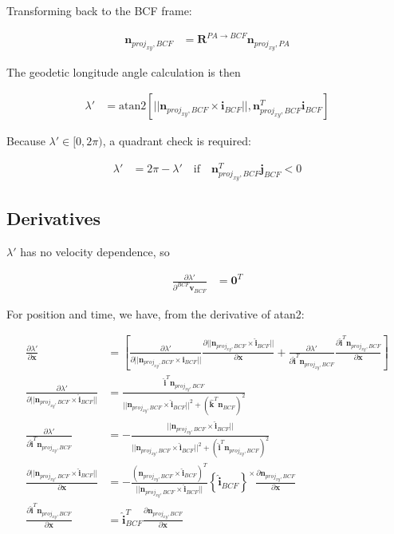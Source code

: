 \documentclass[]{article}
\newcommand{\vb}[1]{\bm{#1}} %
\newcommand{\vbh}[1]{\hat{\bm{#1}}} %
\newcommand{\pd}[2]{\frac{\partial #1}{\partial #2}} %
\newcommand{\crossmat}[1]{\left\{ {#1} \right\}^{\times}} %
\begin{document}
Transforming back to the BCF frame:

\begin{align}
	\vb{n}_{proj_{xy}, BCF} &= \vb{R}^{PA \rightarrow BCF} \vb{n}_{proj_{xy}, PA}
\end{align}

The geodetic longitude angle calculation is then

\begin{align}
	\lambda' &= \mathrm{atan2} \left[ || \vb{n}_{proj_{xy}, BCF} \times \vb{i}_{BCF} ||, \vb{n}_{proj_{xy}, BCF}^T \vb{i}_{BCF} \right]
\end{align}

Because $\lambda' \in [0, 2\pi)$, a quadrant check is required:

\begin{align}
	\lambda' &= 2 \pi - \lambda' \quad \mathrm{if} \quad \vb{n}_{proj_{xy},BCF}^T \vb{j}_{BCF} < 0
\end{align}

\subsection{Derivatives}

$\lambda'$ has no velocity dependence, so

\begin{align}
\pd{\lambda'}{^{BCF} \vb{v}_{BCF}} &= \vb{0}^T
\end{align}

For position and time, we have, from the derivative of atan2:

\begin{align}
\pd{\lambda'}{\vb{x}} &= \left[ \pd{\lambda'}{|| \vb{n}_{proj_{xy},BCF} \times \vbh{i}_{BCF} ||} \pd{|| \vb{n}_{proj_{xy},BCF} \times \vbh{i}_{BCF} ||}{\vb{x}} + \pd{\lambda'}{\vbh{i}^T \vb{n}_{proj_{xy},BCF}} \pd{\vbh{i}^T \vb{n}_{proj_{xy},BCF}}{\vb{x}} \right] \\
\pd{\lambda'}{|| \vb{n}_{proj_{xy},BCF} \times \vbh{i}_{BCF} ||} &= \frac{\vbh{i}^T \vb{n}_{proj_{xy},BCF}}{|| \vb{n}_{proj_{xy},BCF} \times \vbh{i}_{BCF} ||^2 + \left( \vbh{k}^T \vb{n}_{BCF} \right)^2} \\
\pd{\lambda'}{\vbh{i}^T \vb{n}_{proj_{xy},BCF}} &= - \frac{|| \vb{n}_{proj_{xy},BCF} \times \vbh{i}_{BCF} ||}{|| \vb{n}_{proj_{xy},BCF} \times \vbh{i}_{BCF} ||^2 + \left( \vbh{i}^T \vb{n}_{proj_{xy},BCF} \right)^2} \\
\pd{|| \vb{n}_{proj_{xy},BCF} \times \vbh{i}_{BCF} ||}{\vb{x}} &= -\frac{\left( \vb{n}_{proj_{xy},BCF} \times \vbh{i}_{BCF} \right)^T}{|| \vb{n}_{proj_{xy},BCF} \times \vbh{i}_{BCF} ||} \crossmat{\vbh{i}_{BCF}} \pd{\vb{n}_{proj_{xy},BCF}}{\vb{x}} \\
\pd{\vbh{i}^T \vb{n}_{proj_{xy},BCF}}{\vb{x}} &= \vbh{i}_{BCF}^T \pd{\vb{n}_{proj_{xy},BCF}}{\vb{x}}
\end{align}
\end{document}
